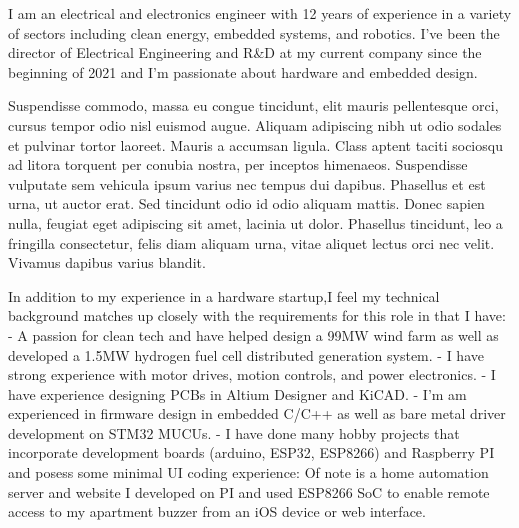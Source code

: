 \documentclass[12pt, letterpaper]{awesome-cv} %
\begin{document}
\makecvheader %

\makelettertitle %


\begin{cvletter}



    I am an electrical and electronics engineer with 12 years of experience in a variety of sectors including clean energy, embedded systems, and robotics. I've been the director of Electrical Engineering and R\&D at my current company since the beginning of 2021 and I'm passionate about hardware and embedded design.



    Suspendisse commodo, massa eu congue tincidunt, elit mauris pellentesque orci, cursus tempor odio nisl euismod augue. Aliquam adipiscing nibh ut odio sodales et pulvinar tortor laoreet. Mauris a accumsan ligula. Class aptent taciti sociosqu ad litora torquent per conubia nostra, per inceptos himenaeos. Suspendisse vulputate sem vehicula ipsum varius nec tempus dui dapibus. Phasellus et est urna, ut auctor erat. Sed tincidunt odio id odio aliquam mattis. Donec sapien nulla, feugiat eget adipiscing sit amet, lacinia ut dolor. Phasellus tincidunt, leo a fringilla consectetur, felis diam aliquam urna, vitae aliquet lectus orci nec velit. Vivamus dapibus varius blandit.



    In addition to my experience in a hardware startup,I feel my technical background matches up closely with the requirements for this role in that I have:
    - A passion for clean tech and have helped design a 99MW wind farm as well as developed a 1.5MW hydrogen fuel cell distributed generation system.
    - I have strong experience with motor drives, motion controls, and power electronics.
    - I have experience designing PCBs in Altium Designer and KiCAD.
    - I'm am experienced in firmware design in embedded C/C++ as well as bare metal driver development on STM32 MUCUs.
    - I have done many hobby projects that incorporate development boards (arduino, ESP32, ESP8266) and Raspberry PI and posess some minimal UI coding experience: Of note is a home automation server and website I developed on PI and used ESP8266 SoC to enable remote access to my apartment buzzer from an iOS device or web interface.


\end{cvletter}


\makeletterclosing %
\end{document}
